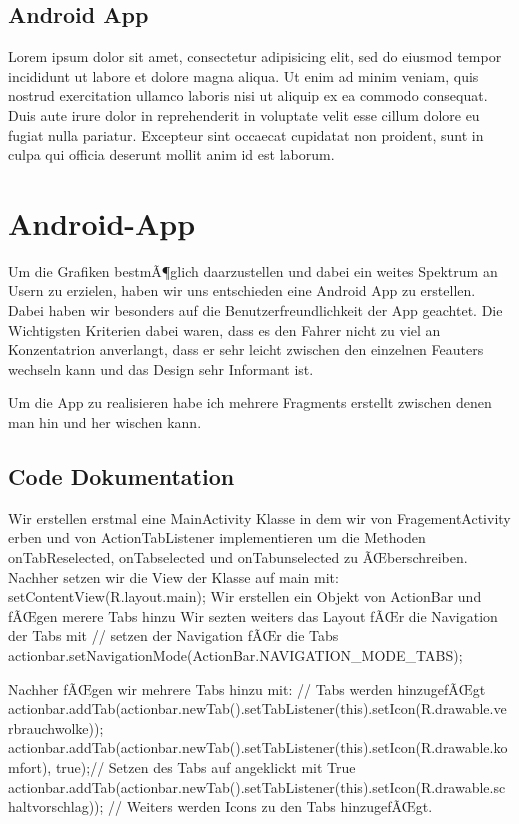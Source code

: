 \subsection{Android App}

Lorem ipsum dolor sit amet, consectetur adipisicing elit, sed do eiusmod
tempor incididunt ut labore et dolore magna aliqua. Ut enim ad minim veniam,
quis nostrud exercitation ullamco laboris nisi ut aliquip ex ea commodo
consequat. Duis aute irure dolor in reprehenderit in voluptate velit esse
cillum dolore eu fugiat nulla pariatur. Excepteur sint occaecat cupidatat non
proident, sunt in culpa qui officia deserunt mollit anim id est laborum.

\section*{Android-App}

Um die Grafiken bestmÃ¶glich daarzustellen und dabei ein weites Spektrum an Usern zu erzielen, haben wir uns entschieden eine Android App zu erstellen. 
Dabei haben wir besonders auf die Benutzerfreundlichkeit der App geachtet.
Die Wichtigsten Kriterien dabei waren, dass es den Fahrer nicht zu viel an Konzentatrion anverlangt, dass er sehr leicht zwischen den einzelnen Feauters wechseln kann und das Design sehr Informant ist.

Um die App zu realisieren habe ich mehrere Fragments erstellt zwischen denen man hin und her wischen kann. 

\subsection*{Code Dokumentation}
Wir erstellen erstmal eine MainActivity Klasse in dem wir von FragementActivity erben und von ActionTabListener implementieren um die Methoden onTabReselected, onTabselected und onTabunselected zu ÃŒberschreiben.              
Nachher setzen wir die View der Klasse auf main mit:               setContentView(R.layout.main);
Wir erstellen ein Objekt von ActionBar und fÃŒgen merere Tabs hinzu
Wir sezten weiters das Layout fÃŒr die Navigation der Tabs mit                           // setzen der Navigation fÃŒr die Tabs  
actionbar.setNavigationMode(ActionBar.NAVIGATION_MODE_TABS);

Nachher fÃŒgen wir mehrere Tabs hinzu mit:
// Tabs werden hinzugefÃŒgt
actionbar.addTab(actionbar.newTab().setTabListener(this).setIcon(R.drawable.verbrauchwolke));
actionbar.addTab(actionbar.newTab().setTabListener(this).setIcon(R.drawable.komfort), true);// Setzen des Tabs auf angeklickt mit True
actionbar.addTab(actionbar.newTab().setTabListener(this).setIcon(R.drawable.schaltvorschlag));
// Weiters werden Icons zu den Tabs hinzugefÃŒgt.

